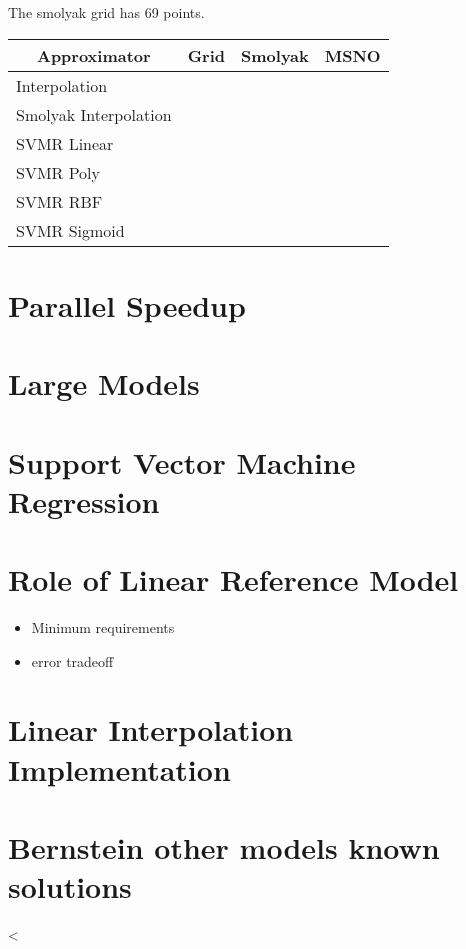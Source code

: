 \documentclass[12pt]{article}
\begin{document}
The smolyak grid has 69 points.

\begin{tabular}{|l|r|r|r|}
\hline
\multicolumn{1}{|c|}{Approximator}&
\multicolumn{1}{|c|}{Grid}&
\multicolumn{1}{|c|}{Smolyak}&
\multicolumn{1}{|c|}{MSNO}\\
\hline
Interpolation  &&&\\
\hline
Smolyak Interpolation  &&&\\
\hline
SVMR Linear &&&\\
\hline
SVMR Poly &&&\\
\hline
SVMR RBF &&&\\
\hline
SVMR Sigmoid &&&\\
\hline
\end{tabular}

\section{Parallel Speedup}
\label{sec:parallel-speedup}

\section{Large Models}
\label{sec:large-models}


\section{Support Vector Machine Regression}
\label{sec:supp-vect-mach}

\section{Role of Linear Reference Model}
\label{sec:role-line-refer}

\begin{itemize}
\item Minimum requirements
\item error tradeoff
\end{itemize}

\section{Linear Interpolation Implementation}
\label{sec:line-interp-impl}


\section{Bernstein other models known solutions}
\label{sec:bernst-other-models}


  
<
\end{document}
